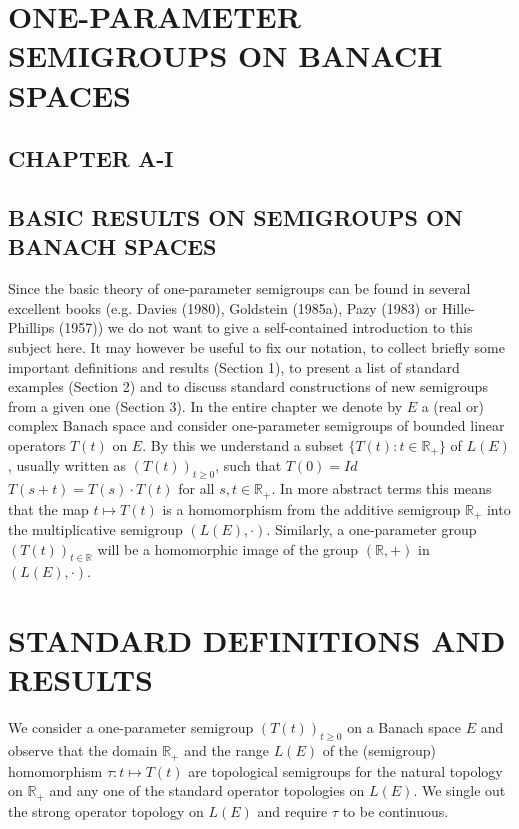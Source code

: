 \documentclass{article}
\begin{document}
\section{ONE-PARAMETER SEMIGROUPS ON BANACH SPACES}

\subsection*{CHAPTER A-I}

\subsection*{BASIC RESULTS ON SEMIGROUPS ON BANACH SPACES}

Since the basic theory of one-parameter semigroups can be found in several excellent books (e.g. Davies (1980), Goldstein (1985a), Pazy (1983) or Hille-Phillips (1957)) we do not want to give a self-contained introduction to this subject here.
It may however be useful to fix our notation, to collect briefly some important definitions and results (Section 1), to present a list of standard examples (Section 2) and to discuss standard constructions of new semigroups from a given one (Section 3).
In the entire chapter we denote by $E$ a (real or) complex Banach space and consider one-parameter semigroups of bounded linear operators $T(t)$ on $E$.
By this we understand a subset $\{T(t): t \in \mathbb{R}_{+}\}$ of $L(E)$, usually written as $(T(t))_{t \geq 0}$, such that
$T(0) = Id$
$T(s+t) = T(s) \cdot T(t)$ for all $s, t \in \mathbb{R}_{+}$.
In more abstract terms this means that the map $t \mapsto T(t)$ is a homomorphism from the additive semigroup $\mathbb{R}_{+}$ into the multiplicative semigroup $(L(E), \cdot)$.
Similarly, a one-parameter group $(T(t))_{t \in \mathbb{R}}$ will be a homomorphic image of the group $(\mathbb{R},+)$ in $(L(E), \cdot)$.

\section{STANDARD DEFINITIONS AND RESULTS}

We consider a one-parameter semigroup $(T(t))_{t \geq 0}$ on a Banach space $E$ and observe that the domain $\mathbb{R}_{+}$ and the range $L(E)$ of the (semigroup) homomorphism $\tau: t \mapsto T(t)$ are topological semigroups for the natural topology on $\mathbb{R}_{+}$ and any one of the standard operator topologies on $L(E)$.
We single out the strong operator topology on $L(E)$ and require $\tau$ to be continuous.
\end{document}
